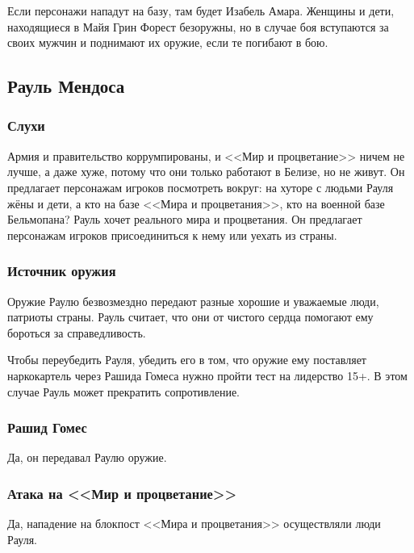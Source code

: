 \documentclass{article}
\begin{document}
Если персонажи нападут на базу, там будет Изабель Амара. Женщины и дети,
находящиеся в Майя Грин Форест безоружны, но в случае боя вступаются за
своих мужчин и поднимают их оружие, если те погибают в бою.

\subsection{Рауль
Мендоса}\label{raul-mendoza}

\subsubsection{Слухи}\label{rumors-mendoza}

Армия и правительство коррумпированы, и <<Мир и процветание>> ничем не
лучше, а даже хуже, потому что они только работают в Белизе, но не
живут. Он предлагает персонажам игроков посмотреть вокруг: на хуторе с
людьми Рауля жёны и дети, а кто на базе <<Мира и процветания>>, кто на
военной базе Бельмопана? Рауль хочет реального мира и процветания. Он
предлагает персонажам игроков присоединиться к нему или уехать из
страны.

\subsubsection{Источник
оружия}\label{weapons-source}

Оружие Раулю безвозмездно передают разные хорошие и уважаемые люди,
патриоты страны. Рауль считает, что они от чистого сердца помогают ему
бороться за справедливость.

Чтобы переубедить Рауля, убедить его в том, что оружие ему поставляет
наркокартель через Рашида Гомеса нужно пройти тест на лидерство 15+. В
этом случае Рауль может прекратить сопротивление.

\subsubsection{Рашид
Гомес}\label{rashid-gomez-mendoza}

Да, он передавал Раулю оружие.

\subsubsection{Атака на <<Мир и
процветание>>}\label{pap-attack-mendoza}

Да, нападение на блокпост <<Мира и процветания>> осуществляли люди Рауля.
\end{document}

